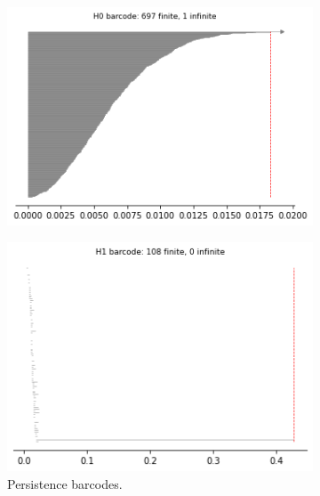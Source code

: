 \begin{figure}[H]
\begin{subfigure}[b]{0.25\textwidth}
\end{subfigure}
\begin{subfigure}[b]{0.24\textwidth}
    \includegraphics[width=\textwidth]{figures/topology/torus_H0_barcode.png}
    \caption{}
\end{subfigure}
\begin{subfigure}[b]{0.24\textwidth}
    \includegraphics[width=\textwidth]{figures/topology/torus_H1_barcode.png}
        \caption{Persistence barcodes.}
\end{subfigure}
\begin{subfigure}[b]{0.24\textwidth}

\end{subfigure}
\end{figure}
